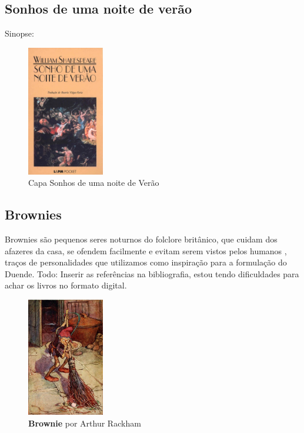 \clearpage

\subsection{Sonhos de uma noite de verão}

Sinopse:


\begin{figure}[!htb]
	\caption{\label{sonhos_shakespeare} Capa Sonhos de uma noite de Verão}
	\begin{center}
	    \includegraphics[width=0.3\textwidth]{imagens/Sonhos.jpg}
	\end{center}
\end{figure}


\subsection{Brownies}

Brownies são pequenos seres noturnos do folclore britânico, que cuidam dos afazeres da casa, se ofendem facilmente e evitam serem vistos pelos humanos \cite{britannica_2011}\cite{carolyn_2016}, traços de personalidades que utilizamos como inspiração para a formulação do Duende.
Todo: Inserir as referências na bibliografia, estou tendo dificuldades para achar os livros no formato digital.
\clearpage
\begin{figure}[!htb]
	\caption{\label{fig_brownie}\textbf{Brownie} por Arthur Rackham }
	\begin{center}
	    \includegraphics[width=0.3\textwidth]{imagens/brownie.jpg}
		\end{center}
\end{figure}

